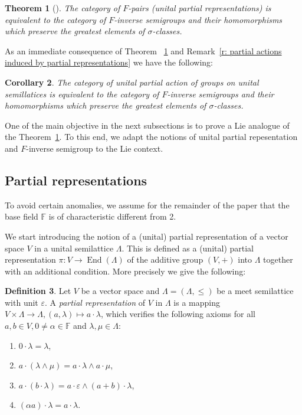 \documentclass{amsart}
\newcommand{\F}{\mathbb{F}}
\newcommand{\0}{{\vartheta}}
\newtheorem{thm}{Theorem}[section]
\newtheorem{cor}[thm]{Corollary}
\theoremstyle{definition}
\newtheorem{defn}[thm]{Definition}
\theoremstyle{remark}
\numberwithin{equation}{section}
\newtheorem*{Theorem A}{\textbf{Theorem A}}
\newtheorem*{Corollary E}{\textbf{Corollary E}}
\newtheorem*{Corollary F}{\textbf{Corollary F}}
\newtheorem*{Theorem B}{\textbf{Theorem B}}
\newtheorem*{Theorem C}{\textbf{Theorem C}}
\newtheorem*{Theorem D}{\textbf{Theorem B}}
\newtheorem*{p a}{\textbf{Proof of  Theorem A}}
\newtheorem*{p b}{\textbf{Proof of Theorem B}}
\newtheorem*{p c}{\textbf{Proof of  Theorem C}}
\newtheorem*{p d}{\textbf{Proof of  Theorem D}}
\DeclareMathOperator{\en}{End}
\begin{document}
\begin{thm}[\cite{Petrich1984}] \label{th: equivalence F-pairs}
The category of $F$-pairs (unital partial representations) is equivalent to the category of $F$-inverse semigroups and their homomorphisms which preserve the greatest elements of $\sigma$-classes.
\end{thm} 
As an immediate consequence of Theorem ~\ref{th: equivalence F-pairs} and Remark~\ref{r: partial actions induced by partial representations} we have the following: 
\begin{cor} The category of unital partial action of groups on unital semillatices is equivalent to the category of $F$-inverse semigroups and their homomorphisms which preserve the greatest elements of $\sigma$-classes.
\end{cor}
One of the main objective in the next subsections is to prove a Lie analogue of the Theorem~\ref{th: equivalence F-pairs}. To this end, we adapt the notions of unital partial repesentation and $F$-inverse semigroup to the Lie context. 









\subsection{Partial representations} 
To avoid certain anomalies, we assume for the remainder of the paper that the base field $\F$ is of characteristic different from 2.

We start introducing the notion of a (unital) partial representation of a vector space $V$ in a unital semilattice  $\Lambda$. This is defined as a (unital) partial representation $\pi: V \to \en(\Lambda)$ of the additive group $(V, +)$ into $\Lambda$ together with an additional condition. More precisely we give the following: 




\begin{defn}\label{defaction_of_L}
Let $V$ be a vector space and  $\Lambda = (\Lambda , \leq)$ be a meet semilattice with unit $\varepsilon$. A {\em  partial representation} of $V$ in $\Lambda$ is a mapping $V\times \Lambda\to \Lambda, (a,\lambda)\mapsto a \cdot \lambda$, which verifies the following axioms for all $a,b\in V, 0\neq\alpha\in\F$ and $\lambda,\mu\in \Lambda$:
\begin{enumerate}
    \item $0\cdot \lambda=\lambda$,
    \item \label{item 2}$a\cdot(\lambda\wedge \mu)=a\cdot\lambda \wedge a\cdot\mu$,
    \item $a\cdot(b\cdot \lambda)=a\cdot\varepsilon \wedge (a+b)\cdot\lambda$,
    \item $(\alpha a)\cdot\lambda=a\cdot \lambda$.
\end{enumerate}
\end{defn}
\end{document}
